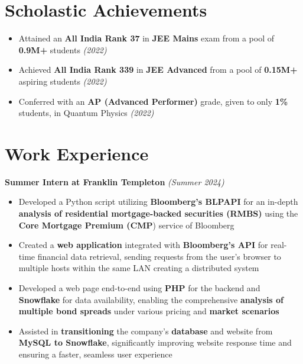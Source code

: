 \documentclass[11pt,letterpaper,sans]{moderncv}
\begin{document}
\section{\LARGE Scholastic Achievements}
\vspace{-4pt}
\begin{itemize}[noitemsep, topsep=0pt]
\item Attained an \textbf{ All India Rank 37} in \textbf{ JEE Mains} exam from a pool of \textbf{ 0.9M+} students
\hfill{\sl \small \textit{(2022)}}
\item Achieved \textbf{All India Rank 339} in \textbf{JEE Advanced} from a pool of \textbf{0.15M+} aspiring students
\hfill{\sl \small \textit{(2022)}}
\item Conferred with an \textbf{ AP (Advanced Performer)} grade, given to only \textbf { 1\%} students, in Quantum Physics
\hfill{\sl \small \textit{(2022)}}
\end{itemize}

\vspace{-10pt}

\section{\LARGE Work Experience}
\vspace{-4pt}

\noindent \textbf{\large Summer Intern at Franklin Templeton} \hfill{\sl \small (Summer 2024)}\\

\begin{itemize}[noitemsep, topsep=0pt, leftmargin=*]
\setlength\itemsep{\subpointspacing}
\vspace{-14pt}
\item Developed a Python script utilizing \textbf{Bloomberg's BLPAPI} for an in-depth \textbf{analysis of residential mortgage-backed securities (RMBS)} using the \textbf{Core Mortgage Premium (CMP}) service of Bloomberg
\item Created a \textbf{web application} integrated with \textbf{Bloomberg's API} for real-time financial data retrieval, sending requests from the user's browser to multiple hosts within the same LAN creating a distributed system
\item Developed a web page end-to-end using \textbf{PHP} for the backend and \textbf{Snowflake} for data availability, enabling the comprehensive \textbf{analysis of multiple bond spreads} under various pricing and \textbf{market scenarios}
\item Assisted in \textbf{transitioning} the company's \textbf{database} and website from \textbf{MySQL to Snowflake}, significantly improving website response time and ensuring a faster, seamless user experience
\end{itemize}
\end{document}
